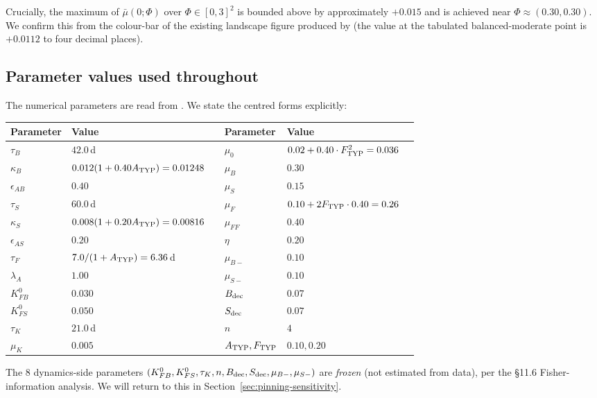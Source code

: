 \documentclass[11pt,a4paper]{article}
\theoremstyle{definition}
\begin{document}
Crucially, the maximum of $\bar\mu(0; \Phi)$ over $\Phi \in [0, 3]^2$ is bounded above by approximately $+0.015$ and is achieved near $\Phi \approx (0.30, 0.30)$. We confirm this from the colour-bar of the existing landscape figure produced by  (the value at the tabulated balanced-moderate point is $+0.0112$ to four decimal places).

\subsection{Parameter values used throughout}

The numerical parameters are read from . We state the centred forms explicitly:
\begin{center}\small
\begin{tabular}{lll lll}
\toprule
Parameter & Value & & Parameter & Value \\
\midrule
$\tau_B$        & $42.0$\,d   && $\mu_0$       & $0.02 + 0.40 \cdot F_{\rm TYP}^2 = 0.036$ \\
$\kappa_B$      & $0.012(1 + 0.40 A_{\rm TYP}) = 0.01248$ && $\mu_B$       & $0.30$ \\
$\epsilon_{AB}$ & $0.40$      && $\mu_S$       & $0.15$ \\
$\tau_S$        & $60.0$\,d   && $\mu_F$       & $0.10 + 2 F_{\rm TYP}\cdot 0.40 = 0.26$ \\
$\kappa_S$      & $0.008(1 + 0.20 A_{\rm TYP}) = 0.00816$ && $\mu_{FF}$    & $0.40$ \\
$\epsilon_{AS}$ & $0.20$      && $\eta$        & $0.20$ \\
$\tau_F$        & $7.0/(1 + A_{\rm TYP}) = 6.36$\,d && $\mu_{B-}$    & $0.10$ \\
$\lambda_A$     & $1.00$      && $\mu_{S-}$    & $0.10$ \\
$K_{FB}^0$      & $0.030$     && $B_{\rm dec}$ & $0.07$ \\
$K_{FS}^0$      & $0.050$     && $S_{\rm dec}$ & $0.07$ \\
$\tau_K$        & $21.0$\,d   && $n$           & $4$ \\
$\mu_K$         & $0.005$     && $A_{\rm TYP}, F_{\rm TYP}$ & $0.10, 0.20$ \\
\bottomrule
\end{tabular}
\end{center}

The 8 dynamics-side parameters $(K_{FB}^0, K_{FS}^0, \tau_K, n, B_{\rm dec}, S_{\rm dec}, \mu_{B-}, \mu_{S-})$ are \emph{frozen} (not estimated from data), per the §11.6 Fisher-information analysis. We will return to this in Section~\ref{sec:pinning-sensitivity}.
\end{document}
